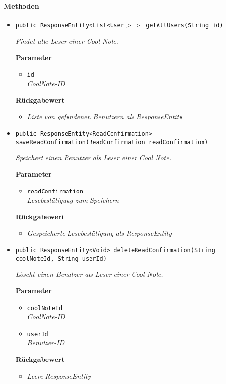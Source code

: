      \paragraph*{Methoden}
     \begin{itemize}
     	\item{\texttt{public ResponseEntity<List<User$>>$ getAllUsers(String id)}}
     	
     	\textit{Findet alle Leser einer Cool Note.}
     	
     	\textbf{Parameter}
     	\begin{itemize}
     		\item\texttt{id}\\
     		\textit{CoolNote-ID}  
     	\end{itemize}
     	
     	\textbf{Rückgabewert}
     	\begin{itemize}
     		\item\textit{Liste von gefundenen Benutzern als ResponseEntity}
     	\end{itemize}
     
     \item{\texttt{public ResponseEntity<ReadConfirmation> saveReadConfirmation(ReadConfirmation readConfirmation)}}
     	
     	\textit{Speichert einen Benutzer als Leser einer Cool Note.}
     	
     	\textbf{Parameter}
     	\begin{itemize}
     		\item\texttt{readConfirmation}\\
     		\textit{Lesebestätigung zum Speichern}  
     	\end{itemize}
     	
     	\textbf{Rückgabewert}
     	\begin{itemize}
     		\item\textit{Gespeicherte Lesebestätigung als ResponseEntity}
     	\end{itemize}
     
     \item{\texttt{public ResponseEntity<Void> deleteReadConfirmation(String coolNoteId, String userId)}}
     	
     	\textit{Löscht einen Benutzer als Leser einer Cool Note.}
     	
     	\textbf{Parameter}
     	\begin{itemize}
     		\item\texttt{coolNoteId}\\
     		\textit{CoolNote-ID}
     		\item\texttt{userId}\\
     		\textit{Benutzer-ID}  
     	\end{itemize}
     
     	\textbf{Rückgabewert}
     	\begin{itemize}
     		\item\textit{Leere ResponseEntity}
     	\end{itemize}
     \end{itemize}
 
